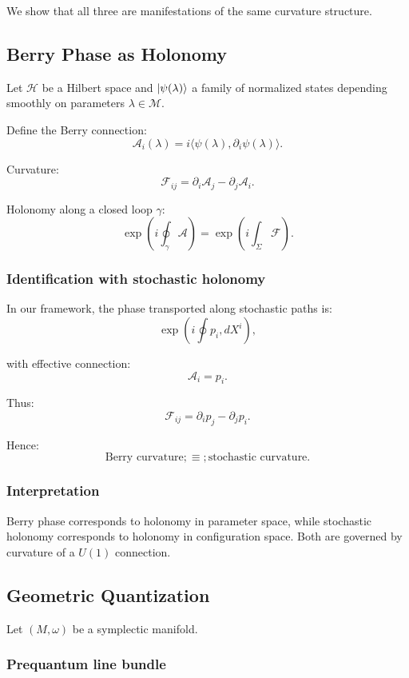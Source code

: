 \documentclass[11pt]{article}
\begin{document}
We show that all three are manifestations of the same curvature structure.

\subsection{Berry Phase as Holonomy}

Let $\mathcal{H}$ be a Hilbert space and $\ket{\psi(\lambda)}$ a family of
normalized states depending smoothly on parameters $\lambda \in \mathcal{M}$.

Define the Berry connection:
\[
\mathcal{A}_i(\lambda) = i \langle \psi(\lambda), \partial_i \psi(\lambda) \rangle.
\]

Curvature:
\[
\mathcal{F}_{ij} = \partial_i \mathcal{A}_j - \partial_j \mathcal{A}_i.
\]

Holonomy along a closed loop $\gamma$:
\[
\exp\left(i \oint_\gamma \mathcal{A}\right)
= \exp\left(i \int_{\Sigma} \mathcal{F}\right).
\]

\subsubsection*{Identification with stochastic holonomy}

In our framework, the phase transported along stochastic paths is:
\[
\exp\left(i \oint p_i, dX^i\right),
\]

with effective connection:
\[
\mathcal{A}_i = p_i.
\]

Thus:
\[
\mathcal{F}_{ij} = \partial_i p_j - \partial_j p_i.
\]

Hence:
\[
\text{Berry curvature} ;\equiv; \text{stochastic curvature}.
\]

\subsubsection*{Interpretation}

Berry phase corresponds to holonomy in parameter space, while stochastic
holonomy corresponds to holonomy in configuration space. Both are governed
by curvature of a $U(1)$ connection.

\subsection{Geometric Quantization}

Let $(M,\omega)$ be a symplectic manifold.

\subsubsection{Prequantum line bundle}
\end{document}

